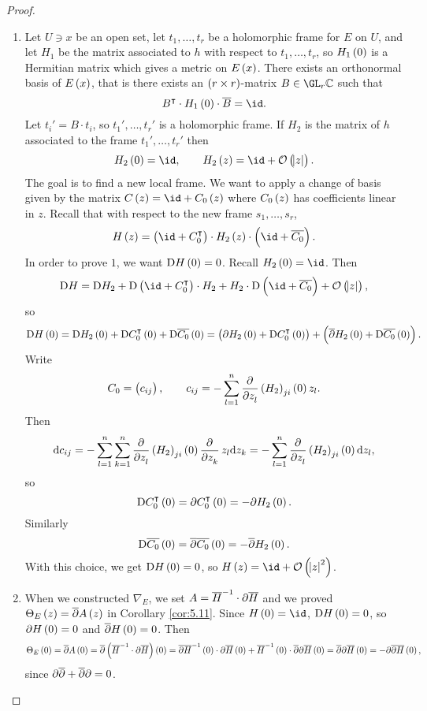 \begin{proof}
\hfill
\begin{enumerate}
\item Let $ U \ni x $ be an open set, let $ t_1, \dots, t_r $ be a holomorphic frame for $ E $ on $ U $, and let $ H_1 $ be the matrix associated to $ h $ with respect to $ t_1, \dots, t_r $, so $ H_1\br{0} $ is a Hermitian matrix which gives a metric on $ E\br{x} $. There exists an orthonormal basis of $ E\br{x} $, that is there exists an $ \br{r \times r} $-matrix $ B \in \GL_r \CC $ such that
$$ B^\intercal \cdot H_1\br{0} \cdot \overline{B} = \id. $$
Let $ t_i' = B \cdot t_i $, so $ t_1', \dots, t_r' $ is a holomorphic frame. If $ H_2 $ is the matrix of $ h $ associated to the frame $ t_1', \dots, t_r' $ then
$$ H_2\br{0} = \id, \qquad H_2\br{z} = \id + \OOO\br{\abs{z}}. $$
The goal is to find a new local frame. We want to apply a change of basis given by the matrix $ C\br{z} = \id + C_0\br{z} $ where $ C_0\br{z} $ has coefficients linear in $ z $. Recall that with respect to the new frame $ s_1, \dots, s_r $,
$$ H\br{z} = \br{\id + C_0^\intercal} \cdot H_2\br{z} \cdot \br{\id + \overline{C_0}}. $$
In order to prove $ 1 $, we want $ \D H\br{0} = 0 $. Recall $ H_2\br{0} = \id $. Then
$$ \D H = \D H_2 + \D\br{\id + C_0^\intercal} \cdot H_2 + H_2 \cdot \D\br{\id + \overline{C_0}} + \OOO\br{\abs{z}}, $$
so
$$ \D H\br{0} = \D H_2\br{0} + \D C_0^\intercal\br{0} + \D\overline{C_0}\br{0} = \br{\da H_2\br{0} + \D C_0^\intercal\br{0}} + \br{\dab H_2\br{0} + \D\overline{C_0}\br{0}}. $$
Write
$$ C_0 = \br{c_{ij}}, \qquad c_{ij} = -\sum_{l = 1}^n \dpd{}{z_l}\br{H_2}_{ji}\br{0}z_l. $$
Then
$$ \d c_{ij} = -\sum_{l = 1}^n \sum_{k = 1}^n \dpd{}{z_l}\br{H_2}_{ji}\br{0}\dpd{}{z_k}z_l\d z_k = -\sum_{l = 1}^n \dpd{}{z_l}\br{H_2}_{ji}\br{0}\d z_l, $$
so
$$ \D C_0^\intercal\br{0} = \da C_0^\intercal\br{0} = -\da H_2\br{0}. $$
Similarly
$$ \D\overline{C_0}\br{0} = \dab\overline{C_0}\br{0} = -\dab H_2\br{0}. $$
With this choice, we get $ \D H\br{0} = 0 $, so $ H\br{z} = \id + \OOO\br{\abs{z}^2} $.


\item When we constructed $ \nabla_E $, we set $ A = \overline{H}^{-1} \cdot \partial\overline{H} $ and we proved $ \Theta_E\br{z} = \dab A\br{z} $ in Corollary \ref{cor:5.11}. Since $ H\br{0} = \id $, $ \D H\br{0} = 0 $, so $ \da H\br{0} = 0 $ and $ \dab H\br{0} = 0 $. Then
$$ \Theta_E\br{0} = \dab A\br{0} = \dab\br{\overline{H}^{-1} \cdot \da\overline{H}}\br{0} = \dab\overline{H}^{-1}\br{0} \cdot \da\overline{H}\br{0} + \overline{H}^{-1}\br{0} \cdot \dab\da\overline{H}\br{0} = \dab\da\overline{H}\br{0} = -\da\dab\overline{H}\br{0}, $$
since $ \partial\overline{\partial} + \overline{\partial}\partial = 0 $.
\end{enumerate}
\end{proof}


